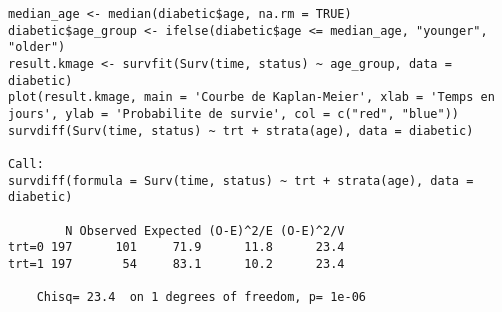 \documentclass[../main.tex]{subfiles}
\begin{document}
\begin{CJK*}{UTF8}{gbsn}
\begin{lstlisting}
median_age <- median(diabetic$age, na.rm = TRUE)
diabetic$age_group <- ifelse(diabetic$age <= median_age, "younger", "older")
result.kmage <- survfit(Surv(time, status) ~ age_group, data = diabetic)
plot(result.kmage, main = 'Courbe de Kaplan-Meier', xlab = 'Temps en jours', ylab = 'Probabilite de survie', col = c("red", "blue"))
survdiff(Surv(time, status) ~ trt + strata(age), data = diabetic)
    
Call:
survdiff(formula = Surv(time, status) ~ trt + strata(age), data = diabetic)
    
        N Observed Expected (O-E)^2/E (O-E)^2/V
trt=0 197      101     71.9      11.8      23.4
trt=1 197       54     83.1      10.2      23.4
    
    Chisq= 23.4  on 1 degrees of freedom, p= 1e-06
\end{lstlisting}

\end{CJK*}
\end{document}
